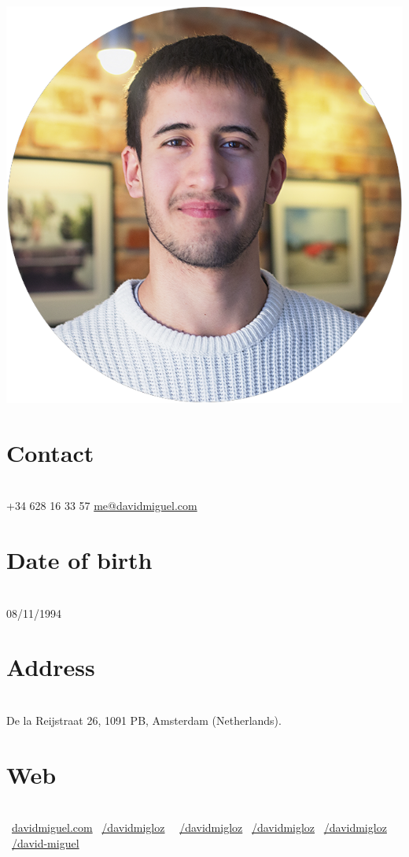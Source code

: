 \documentclass[]{friggeri-cv}
\begin{document}
      

\begin{aside}
  \includegraphics[scale=0.18]{img/profile.png}
  \section{Contact}
    \\[0.3cm]  
    +34 628 16 33 57
    \href{mailto:me@davidmiguel.com}{me@davidmiguel.com}
    ~  
  \section{Date of birth}
    \\[0.3cm]    
    08/11/1994
    ~
  \section{Address}
    \\[0.3cm]  
    De la Reijstraat 26,
    1091 PB, Amsterdam
    (Netherlands).
    ~    
  \section{Web}
    \\[0.3cm]
    \faGlobe\ \href{http://davidmiguel.com}{davidmiguel.com}
    \faLinkedin\ \href{https://www.linkedin.com/in/davidmigloz}{/davidmigloz}
    \faFacebook\ \ \href{https://www.facebook.com/DavidMigLoz}{/davidmigloz}
    \faTwitter\ \href{https://twitter.com/DavidMigLoz}{/davidmigloz}
    \faGithub\ \href{https://github.com/davidmigloz/}{/davidmigloz}
    \faStackOverflow\ \href{http://stackoverflow.com/users/6305235/david-miguel}{/david-miguel}
    ~

\end{aside}
\end{document}
